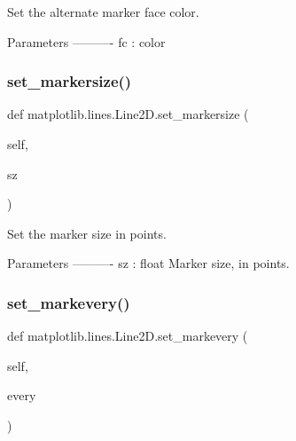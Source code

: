 \begin{DoxyVerb}Set the alternate marker face color.

Parameters
----------
fc : color
\end{DoxyVerb}
 \mbox{\label{classmatplotlib_1_1lines_1_1Line2D_a5d31136e08b5243bfb41aa4d727de8e5}} 
\subsubsection{\texorpdfstring{set\+\_\+markersize()}{set\_markersize()}}
{\footnotesize\ttfamily def matplotlib.\+lines.\+Line2\+D.\+set\+\_\+markersize (\begin{DoxyParamCaption}\item[{}]{self,  }\item[{}]{sz }\end{DoxyParamCaption})}

\begin{DoxyVerb}Set the marker size in points.

Parameters
----------
sz : float
     Marker size, in points.
\end{DoxyVerb}
 \mbox{\label{classmatplotlib_1_1lines_1_1Line2D_a09612714c46e6acb352d45b217f267d2}} 
\subsubsection{\texorpdfstring{set\+\_\+markevery()}{set\_markevery()}}
{\footnotesize\ttfamily def matplotlib.\+lines.\+Line2\+D.\+set\+\_\+markevery (\begin{DoxyParamCaption}\item[{}]{self,  }\item[{}]{every }\end{DoxyParamCaption})}


